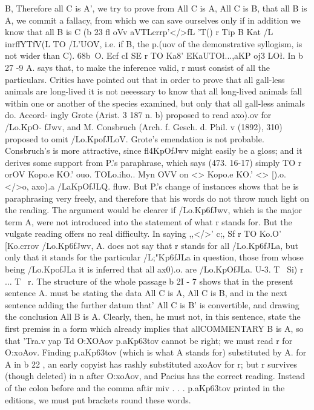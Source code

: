 {{{{{{{{{{{{{{{{{{{B, Therefore all C is A', we try to prove from All C is A, All C
is B, that all B is A, we commit a fallacy, from which we can
save ourselves only if in addition we know that all B is C (b 23 fl
oVv aVTLcrrp'</>fL 'T() r Tip B Kat /L~ inrffYTf{V(L TO /L'UOV, i.e. if B, the
p.(uov of the demonstrative syllogism, is not wider than C).
68b~O. Ecf c{I SE r TO Ka8' EKaUTO\l ...,aKP oj3 LO\l. In b 27 -9 A.
says that, to make the inference valid, r must consist of all
the particulars. Critics have pointed out that in order to prove
that all gall-less animals are long-lived it is not neeessary to
know that all long-lived animals fall within one or another of the
species examined, but only that all gall-less animals do. Accord-
ingly Grote (Arist. 3 187 n. b) proposed to read axo).ov for /Lo.KpO-
fJwv, and M. Consbruch (Arch. f. Gesch. d. Phil. v (1892), 310)
proposed to omit /Lo.KpofJLoV. Grote's emendation is not probable.
Consbruch's is more attractive, since fl4KpOfJwv might easily be
a gloss; and it derives some support from P.'s paraphrase, which
says (473. 16-17) simply TO r orOV Kopo.e KO.' ouo. TOLo.iho.. Myn OVV
on <> Kopo.e KO.' <> [).o.</>o, axo).a /LaKpOfJLQ. fluw. But P.'s change of
instances shows that he is paraphrasing very freely, and therefore
that his words do not throw much light on the reading. The
argument would be clearer if /Lo.Kp6fJwv, which is the major term A,
were not introduced into the statement of what r stands for.
But the vulgate reading offers no real difficulty. In saying ,,</>'
c;, Sf r TO Ko.O' [Ko.crrov /Lo.Kp6fJwv, A. does not say that r stands for
all /Lo.Kp6fJLa, but only that it stands for the particular /L;"Kp6fJLa
in question, those from whose being /Lo.KpofJLa it is inferred that all
ax0).o. are /Lo.KpOfJLa.
U-3. T~ Si) r ... T~ r. The structure of the whole passage
b 2I - 7 shows that in the present sentence A. must be stating the
data All C is A, All C is B, and in the next sentence adding
the further datum that' All C is B' is convertible, and drawing the
conclusion All B is A. Clearly, then, he must not, in this sentence,
state the first premiss in a form which already implies that allCOMMENTARY
B is A, so that 'Tra.v yap Td O:XOAov p.aKp6{3tov cannot be right; we
must read r for O:xoAov. Finding p.aKp6{3tov (which is what A
stands for) substituted by A. for A in b 22 , an early copyist has
rashly substituted axoAov for r; but r survives (though deleted)
in n after O:xoAov, and Pacius has the correct reading. Instead of
the colon before and the comma aftir miv . . . p.aKp6{3tov printed
in the editions, we must put brackets round these words.
}}}}}}}}}}}}}}}}}}}}}}}}
